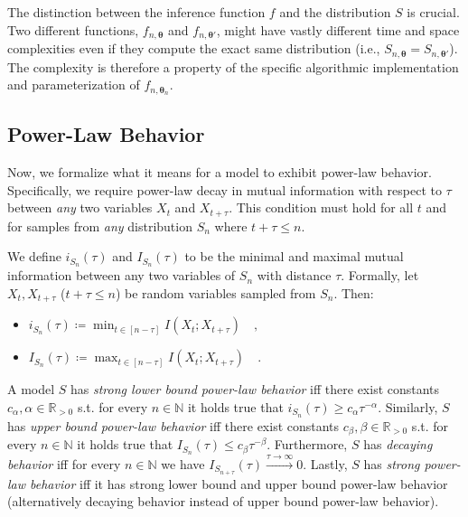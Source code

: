 \documentclass[../../main.tex]{subfiles}
\begin{document}
    \begin{remark}
        The distinction between the inference function $f$ and the distribution $S$ is crucial. Two different functions, $f_{n, \bm{\theta}}$ and $f_{n, \bm{\theta}'}$, might have vastly different time and space complexities even if they compute the exact same distribution (i.e., $S_{n, \bm{\theta}} = S_{n, \bm{\theta}'}$). The complexity is therefore a property of the specific algorithmic implementation and parameterization of $f_{n, \bm{\theta}_n}$.
    \end{remark}


\subsection{Power-Law Behavior}
    Now, we formalize what it means for a model to exhibit power-law behavior. Specifically, we require power-law decay in mutual information with respect to $\tau$ between \emph{any} two variables $X_t$ and $X_{t + \tau}$. This condition must hold for all $t$ and for samples from \emph{any} distribution $S_n$ where $t + \tau \leq n$.

    \begin{definition}
        We define $i_{S_n}(\tau)$ and $I_{S_n}(\tau)$ to be the minimal and maximal mutual information between any two variables of $S_n$ with distance $\tau$. Formally, let $X_t, X_{t + \tau}$ ($t + \tau \leq n$) be random variables sampled from $S_n$. Then:
        \begin{itemize}
            \item $i_{S_n}(\tau) \coloneqq \min_{t \in [n - \tau]} I(X_t; X_{t + \tau}) \quad ,$
            \item $I_{S_n}(\tau) \coloneqq \max_{t \in [n - \tau]} I(X_t; X_{t + \tau}) \quad .$
        \end{itemize}
    \end{definition}

    \begin{definition}
        \label{definition:strong_model_power_law_behavior}
        A model $S$ has \emph{strong lower bound power-law behavior} iff there exist constants $c_\alpha, \alpha \in \mathbb{R}_{>0}$ s.t. for every $n \in \mathbb{N}$ it holds true that $i_{S_n}(\tau) \geq c_\alpha \tau^{-\alpha}$. Similarly, $S$ has \emph{upper bound power-law behavior} iff there exist constants $c_\beta, \beta \in \mathbb{R}_{>0}$ s.t. for every $n \in \mathbb{N}$ it holds true that $I_{S_n}(\tau) \leq c_\beta \tau^{-\beta}$. Furthermore, $S$ has \emph{decaying behavior} iff for every $n \in \mathbb{N}$ we have $I_{S_{n + \tau}}(\tau) \xrightarrow{\tau \to \infty} 0$. Lastly, $S$ has \emph{strong power-law behavior} iff it has strong lower bound and upper bound power-law behavior (alternatively decaying behavior instead of upper bound power-law behavior).
    \end{definition}
\end{document}
